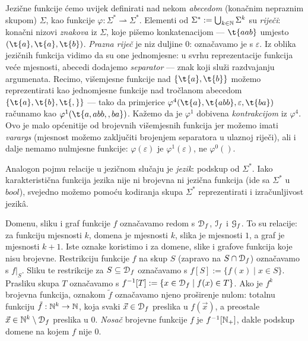 Jezične funkcije ćemo uvijek definirati nad nekom \emph{abecedom} (konačnim nepraznim skupom) $\Sigma$, kao funkcije $\varphi:\Sigma^*\rightharpoonup\Sigma^*$. Elementi od $\Sigma^*:=\bigcup_{k\in{\mathbb N}}\Sigma^k$ su \emph{riječi}: konačni nizovi \emph{znakova} iz $\Sigma$, koje pišemo konkatenacijom --- $\t{aab}$ umjesto $(\t{a},\t{a},\t{b})$. \emph{Prazna riječ} je niz duljine $0$: označavamo je s $\varepsilon$. Iz oblika jezičnih funkcija vidimo da su one jednomjesne: u svrhu reprezentacije funkcija veće mjesnosti, abecedi dodajemo \emph{separator} --- znak koji služi razdvajanju argumenata. Recimo, višemjesne funkcije nad $\{\t{a},\t{b}\}$ možemo reprezentirati kao jednomjesne funkcije nad tročlanom abecedom $\{\t{a},\t{b},\t{,}\}$ --- tako da primjerice $\varphi^4(\t{a},\t{abb},\varepsilon,\t{ba})$ računamo kao $\varphi^1(\t{a{},{}a{}b{}b{},{},{}b{}a})$. Kažemo da je $\varphi^1$ dobivena \emph{kontrakcijom} iz $\varphi^4$. Ovo je malo općenitije od brojevnih višemjesnih funkcija jer možemo imati \emph{varargs} (mjesnost možemo zaključiti brojenjem separatora u ulaznoj ri\-je\-či), ali i dalje nemamo nulmjesne funkcije: $\varphi(\varepsilon)$ je $\varphi^1(\varepsilon)$, ne $\varphi^0()$. %

Analogon pojmu relacije u jezičnom slučaju je \emph{jezik}: podskup od $\Sigma^*$. Iako karakteristična funkcija jezika nije ni brojevna ni jezična funkcija (ide sa $\Sigma^*$ u $bool$), svejedno možemo pomoću kodiranja skupa $\Sigma^*$ reprezentirati i izračunljivost jezikâ. %

Domenu, sliku i graf funkcije $f$ označavamo redom s $\mathcal D_{f}$, $\mathcal I_{f}$ i $\mathcal G_{f}$. To su relacije: za funkciju mjesnosti $k$, domena je mjesnosti $k$, slika je mjesnosti $1$, a graf je mjesnosti $k+1$. Iste oznake koristimo i za domene, slike i grafove funkcija koje nisu brojevne. Restrikciju funkcije $f$ na skup $S$ (zapravo na $S\cap\mathcal D_{f}$) označavamo s $f|_S$. Sliku te restrikcije za $S\subseteq\mathcal D_{f}$ označavamo s $f[S]:=\{f(x)\mid x\in S\}$. Prasliku skupa $T$ označavamo s $f^{-1}[T]:=\{x\in\mathcal D_{f}\mid f(x)\in T\}$. Ako je $f^k$ brojevna funkcija, oznakom $\tilde f$ označavamo njeno proširenje nulom: totalnu funkciju $\tilde{f}:{\mathbb N}^k\to{\mathbb N}$, koja svaki $\vec x\in\mathcal D_{f}$ preslika u $f(\vec x)$, a preostale $\vec x\in{\mathbb N}^k\setminus\mathcal D_{f}$ preslika u $0$. \emph{Nosač} brojevne funkcije $f$ je $f^{-1}[{\mathbb N}_+]$, dakle podskup domene na kojem $f$ nije $0$.

